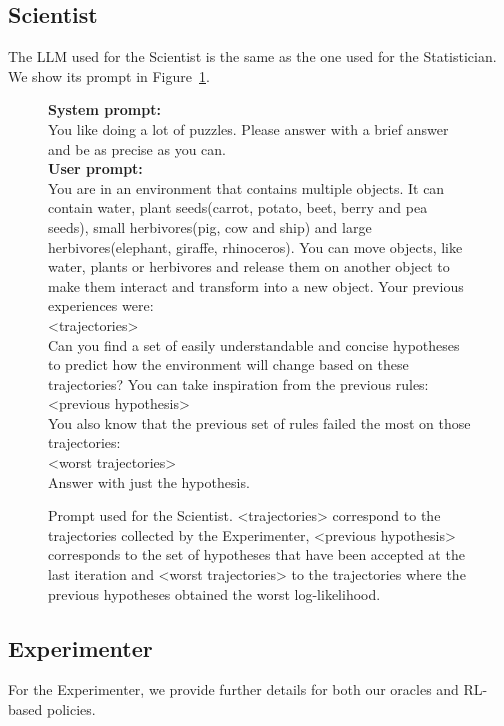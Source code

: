 \documentclass{article}
\begin{document}
\subsection{Scientist}
The LLM used for the Scientist is the same as the one used for the Statistician. We show its prompt in Figure~\ref{prompt:Scientist}.

\begin{figure}[hbt]
    \begin{promptbox}{}
        \textbf{System prompt:}\\
        You like doing a lot of puzzles. Please answer with a brief answer and be as precise as you can. \\
        \textbf{User prompt:}\\
        You are in an environment that contains multiple objects. It can contain water, plant seeds(carrot, potato, beet, berry and pea seeds), small herbivores(pig, cow and ship) and large herbivores(elephant, giraffe, rhinoceros). You can move objects, like water, plants or herbivores and release them on another object to make them interact and transform into a new object. Your previous experiences were: \\ <trajectories> \\ Can you find a set of easily understandable and concise hypotheses to predict how the environment will change based on these trajectories? You can take inspiration from the previous rules:\\
        <previous hypothesis> \\
        You also know that the previous set of rules failed the most on those trajectories: \\
        <worst trajectories>
        \\
        Answer with just the hypothesis.
    \end{promptbox}
    \caption{Prompt used for the Scientist. <trajectories> correspond to the trajectories collected by the Experimenter, <previous hypothesis> corresponds to the set of hypotheses that have been accepted at the last iteration and <worst trajectories> to the trajectories where the previous hypotheses obtained the worst log-likelihood.}
    \label{prompt:Scientist}
\end{figure}

\subsection{Experimenter}
For the Experimenter, we provide further details for both our oracles and RL-based policies.
\end{document}

